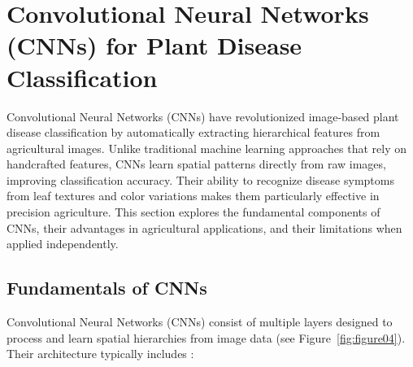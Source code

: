 \section{Convolutional Neural Networks (CNNs) for Plant Disease Classification}

Convolutional Neural Networks (CNNs) have revolutionized image-based plant disease classification by automatically extracting hierarchical features from agricultural images. Unlike traditional machine learning approaches that rely on handcrafted features, CNNs learn spatial patterns directly from raw images, improving classification accuracy. Their ability to recognize disease symptoms from leaf textures and color variations makes them particularly effective in precision agriculture. This section explores the fundamental components of CNNs, their advantages in agricultural applications, and their limitations when applied independently.

\subsection{Fundamentals of CNNs}
Convolutional Neural Networks (CNNs) consist of multiple layers designed to process and learn spatial hierarchies from image data (see Figure~\ref{fig:figure04}). Their architecture typically includes \parencite{alzubaidi2021review}:

